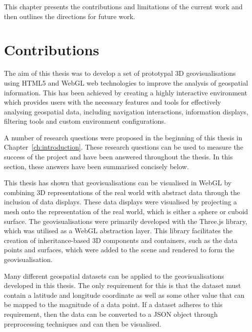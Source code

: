 
This chapter presents the contributions and limitations of the current work and then outlines the directions for future work.

\section{Contributions} {
\label{sec:contributions}
	
	The aim of this thesis was to develop a set of prototypal 3D geovisualisations using HTML5 and WebGL web technologies to improve the analysis of geospatial information. This has been achieved by creating a highly interactive environment which provides users with the necessary features and tools for effectively analysing geospatial data, including navigation interactions, information displays, filtering tools and custom environment configurations.

	A number of research questions were proposed in the beginning of this thesis in Chapter~\ref{ch:introduction}. These research questions can be used to measure the success of the project and have been answered throughout the thesis. In this section, these answers have been summarised concisely below.

	This thesis has shown that geovisualisations can be visualised in WebGL by combining 3D representations of the real world with abstract data through the inclusion of data displays. These data displays were visualised by projecting a mesh onto the representation of the real world, which is either a sphere or cuboid surface. The geovisualisations were primarily developed with the Three.js library, which was utilised as a WebGL abstraction layer. This library facilitates the creation of inheritance-based 3D components and containers, such as the data points and surfaces, which were added to the scene and rendered to form the geovisualisation.

	Many different geospatial datasets can be applied to the geovisualisations developed in this thesis. The only requirement for this is that the dataset must contain a latitude and longitude coordinate as well as some other value that can be mapped to the magnitude of a data point. If a dataset adheres to this requirement, then the data can be converted to a JSON object through preprocessing techniques and can then be visualised.

}
